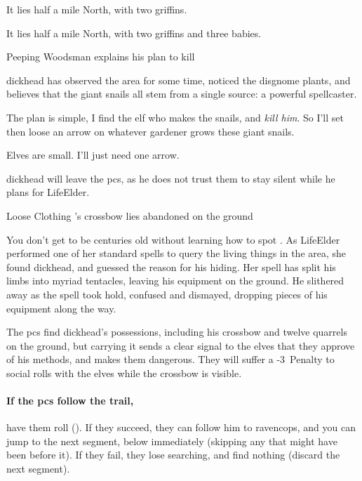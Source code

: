 \begin{multicols}{2}
\or
  It lies half a mile North, with two \glspl{griffin}.

\else
  It lies half a mile North, with two \glspl{griffin} and three babies.

\fi

{Peeping Woodsman}%
{ explains his plan to kill }%

\Gls{dickhead} has observed the area for some time, noticed the \gls{disgnome} plants, and believes that the giant snails all stem from a single source: a powerful spellcaster.

\begin{speechtext}
  The plan is simple, I find the elf who makes the snails, and \emph{kill him}.
  So I'll set  then loose an arrow on whatever gardener grows these giant snails.

  Elves are small.
  I'll just need one arrow.
\end{speechtext}

\Gls{dickhead} will leave the \glspl{pc}, as he does not trust them to stay silent while he plans  for \gls{LifeElder}.

{Loose Clothing}%
{'s crossbow lies abandoned on the ground}%

\begin{exampletext}
  You don't get to be centuries old without learning how to spot .
  As \gls{LifeElder} performed one of her standard spells to query the living things in the area, she found \gls{dickhead}, and guessed the reason for his hiding.
  Her spell has split his limbs into myriad tentacles, leaving his equipment on the ground.
  He slithered away as the spell took hold, confused and dismayed, dropping pieces of his equipment along the way.
\end{exampletext}

The \glspl{pc} find \gls{dickhead}'s possessions, including his \gls{crossbow} and twelve quarrels on the ground, but carrying it sends a clear signal to the elves that they approve of his methods, and makes them dangerous.
They will suffer a -3~Penalty to social rolls with the elves while the \gls{crossbow} is visible.

\paragraph{If the \glspl{pc} follow the trail,}
have them roll  (\tn[10]).
If they succeed, they can follow him to \gls{ravencops}, and you can jump to the next \gls{segment}, below immediately (skipping any that might have been before it).
If they fail, they lose  searching, and find nothing (discard the next \gls{segment}).


\end{multicols}
